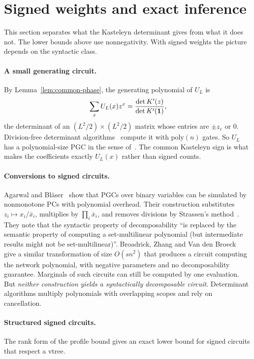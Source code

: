 \section{Signed weights and exact inference}\label{sec:signed}

This section separates what the Kasteleyn determinant gives from what it does not. The lower bounds above use nonnegativity. With signed weights the picture depends on the syntactic class.

\paragraph{A small generating circuit.} By Lemma~\ref{lem:common-phase}, the generating polynomial of $U_L$ is
\[
  \sum_xU_L(x)z^x=\frac{\det K'(z)}{\det K'(\mathbf{1})},
\]
the determinant of an $(L^2/2)\times(L^2/2)$ matrix whose entries are $\pm z_e$ or $0$. Division-free determinant algorithms~\cite{Berkowitz84,MahajanVinay99} compute it with $\mathrm{poly}(n)$ gates. So $U_L$ has a polynomial-size PGC in the sense of~\cite{ZhangJubaVdB21}. The common Kasteleyn sign is what makes the coefficients exactly $U_L(x)$ rather than signed counts.

\paragraph{Conversions to signed circuits.} Agarwal and Bl\"aser~\cite[Thm.~8.1]{AgarwalBlaser24} show that PGCs over binary variables can be simulated by nonmonotone PCs with polynomial overhead. Their construction substitutes $z_i\mapsto x_i/\bar x_i$, multiplies by $\prod_i\bar x_i$, and removes divisions by Strassen's method~\cite{Strassen73}. They note that the syntactic property of decomposability ``is replaced by the semantic property of computing a set-multilinear polynomial (but intermediate results might not be set-multilinear)''. Broadrick, Zhang and Van den Broeck~\cite[Thm.~3]{BroadrickZhangVdB24} give a similar transformation of size $O(sn^2)$ that produces a circuit computing the network polynomial, with negative parameters and no decomposability guarantee. Marginals of such circuits can still be computed by one evaluation. But \emph{neither construction yields a syntactically decomposable circuit}. Determinant algorithms multiply polynomials with overlapping scopes and rely on cancellation.


\paragraph{Structured signed circuits.} The rank form of the profile bound gives an exact lower bound for signed circuits that respect a vtree.

